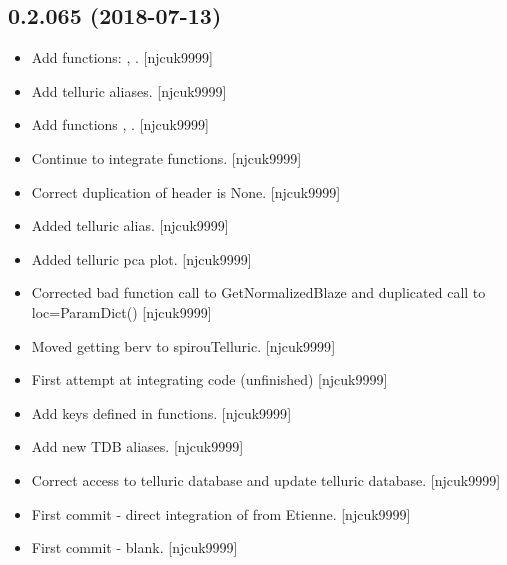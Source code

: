 \documentclass[a4paper,10pt,english]{report}
\begin{document}
\subsection{0.2.065 (2018-07-13)}
\label{\detokenize{misc/changelog:id394}}\begin{itemize}
\item {} 
Add functions: , . {[}njcuk9999{]}

\item {} 
Add telluric aliases. {[}njcuk9999{]}

\item {} 
Add functions , .
{[}njcuk9999{]}

\item {} 
Continue to integrate functions. {[}njcuk9999{]}

\item {} 
Correct duplication of header is None. {[}njcuk9999{]}

\item {} 
Added telluric alias. {[}njcuk9999{]}

\item {} 
Added telluric pca plot. {[}njcuk9999{]}

\item {} 
Corrected bad function call to GetNormalizedBlaze and duplicated call
to loc=ParamDict() {[}njcuk9999{]}

\item {} 
Moved getting berv to spirouTelluric. {[}njcuk9999{]}

\item {} 
First attempt at integrating code (unfinished) {[}njcuk9999{]}

\item {} 
Add keys defined in functions. {[}njcuk9999{]}

\item {} 
Add new TDB aliases. {[}njcuk9999{]}

\item {} 
Correct access to telluric database and update telluric database.
{[}njcuk9999{]}

\item {} 
First commit - direct integration of  from Etienne.
{[}njcuk9999{]}

\item {} 
First commit - blank. {[}njcuk9999{]}


\end{itemize}
\end{document}
